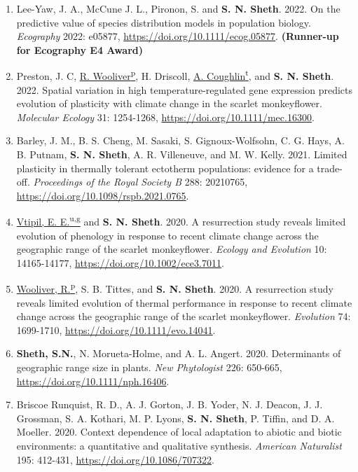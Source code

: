 \documentclass[11pt,english]{article}\usepackage[]{graphicx}\usepackage[]{xcolor}
\begin{document}
\begin{hangparas}{.5in}{1}
\begin{enumerate}
\item Lee-Yaw, J. A., McCune J. L., Pironon, S. and \textbf{S. N. Sheth}. 2022. On the predictive value of species distribution models in population biology. \emph{Ecography} 2022: e05877, \url{https://doi.org/10.1111/ecog.05877}. \textbf{(Runner-up for Ecography E4 Award)}

\item Preston, J. C, \underline{R. Wooliver\textsuperscript{p}}, H. Driscoll, \underline{A. Coughlin\textsuperscript{t}}, and \textbf{S. N. Sheth}. 2022. Spatial variation in high temperature-regulated gene expression predicts evolution of plasticity with climate change in the scarlet monkeyflower. \emph{Molecular Ecology} 31: 1254-1268, \url{https://doi.org/10.1111/mec.16300}. 

\item Barley, J. M., B. S. Cheng, M. Sasaki, S. Gignoux-Wolfsohn, C. G. Hays, A. B. Putnam, \textbf{S. N. Sheth}, A. R. Villeneuve, and M. W. Kelly. 2021. Limited plasticity in thermally tolerant ectotherm populations: evidence for a trade-off. \emph{Proceedings of the Royal Society B} 288: 20210765, \url{https://doi.org/10.1098/rspb.2021.0765}.

\item \underline{Vtipil, E. E.\textsuperscript{u,g}} and \textbf{S. N. Sheth}. 2020. A resurrection study reveals limited evolution of phenology in response to recent climate change across the geographic range of the scarlet monkeyflower. \emph{Ecology and Evolution} 10: 14165-14177, \url{https://doi.org/10.1002/ece3.7011}.

\item \underline{Wooliver, R.\textsuperscript{p}}, S. B. Tittes, and \textbf{S. N. Sheth}. 2020. A resurrection study reveals limited evolution of thermal performance in response to recent climate change across the geographic range of the scarlet monkeyflower. \emph{Evolution} 74: 1699-1710, \url{https://doi.org/10.1111/evo.14041}.

\item \textbf{Sheth, S.N.}, N. Morueta-Holme, and A. L. Angert. 2020. Determinants of geographic range size in plants. \emph{New Phytologist} 226: 650-665, \url{https://doi.org/10.1111/nph.16406}.

\item Briscoe Runquist, R. D., A. J. Gorton, J. B. Yoder, N. J. Deacon, J. J. Grossman, S. A. Kothari, M. P. Lyons, \textbf{S. N. Sheth}, P. Tiffin, and D. A. Moeller. 2020. Context dependence of local adaptation to abiotic and biotic environments: a quantitative and qualitative synthesis. \emph{American Naturalist} 195: 412-431, \url{https://doi.org/10.1086/707322}.


\end{enumerate}
\end{hangparas}
\end{document}
